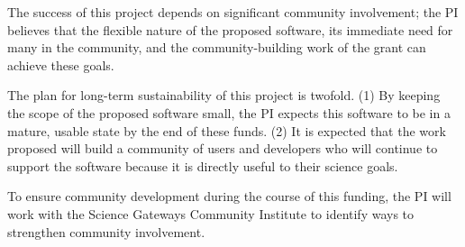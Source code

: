 The success of this project depends on significant community involvement; the PI believes that the flexible nature of the proposed software, its immediate need for many in the community, and the community-building work of the grant can achieve these goals.

The plan for long-term sustainability of this project is twofold.  (1) By keeping the scope of the proposed software small, the PI expects this software to be in a mature, usable state by the end of these funds.   (2) It is expected that the work proposed will build a community of users and developers who will continue to support the software because it is directly useful to their science goals.

To ensure community development during the course of this funding, the PI will work with the Science Gateways Community Institute to identify ways to strengthen community involvement.